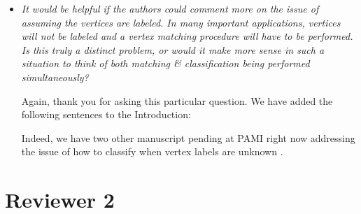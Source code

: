\documentclass[11pt]{article}
\begin{document}
\begin{itemize}
	
	\item \emph{It would be helpful if the authors could comment more on the issue of assuming the vertices are labeled. In many important applications, vertices will not be labeled and a vertex matching procedure will have to be performed. Is this truly a distinct problem, or would it make more sense in such a situation to think of both matching \& classification being performed simultaneously?}
	
	Again, thank you for asking this particular question.  We have added the following sentences to the Introduction:
	
	
	Indeed, we have two other manuscript pending at PAMI right now addressing the issue of how to classify when vertex labels are unknown \cite{VP11_QAP, VP11_unlabeled}.  
	
	
\end{itemize}


\section{Reviewer 2}
\end{document}
